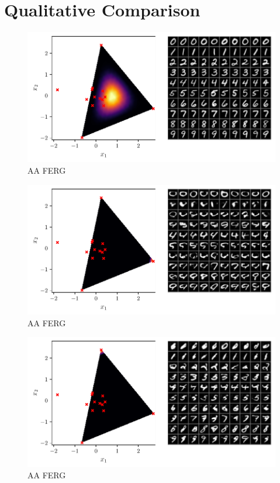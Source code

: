 \section{Qualitative Comparison}%
\label{sec:qualitative_comparison}

\begin{figure}[htpb]
    \centering
    \includegraphics[width=1\linewidth]{figures/samples/aa_emnist.pdf}
    \caption{AA FERG}%
    \label{fig:aa_emnist}
\end{figure}

\begin{figure}[htpb]
    \centering
    \includegraphics[width=1\linewidth]{figures/samples/aa_emnist1.pdf}
    \caption{AA FERG}%
    \label{fig:aa_emnist}
\end{figure}

\begin{figure}[htpb]
    \centering
    \includegraphics[width=1\linewidth]{figures/samples/aa_emnist2.pdf}
    \caption{AA FERG}%
    \label{fig:aa_emnist}
\end{figure}

